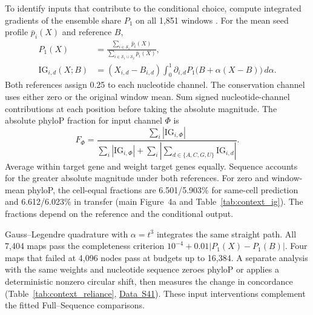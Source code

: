 \documentclass[11pt,a4paper]{article}
\newcommand{\tref}[1]{Table~\ref{#1}}
\newcommand{\data}[1]{\hyperref[data:S#1]{Data~S#1}}
\begin{document}
To identify inputs that contribute to the conditional choice, compute integrated gradients of the ensemble share $P_1$ on all 1,851 windows \citep{sundararajan2017integrated}. For the mean seed profile $\bar p_i(X)$ and reference $B$,
\begin{equation}\label{eq:share-ig}
\begin{aligned}
P_1(X)&=\frac{\sum_{i\in\mathcal S_1}\bar p_i(X)}
{\sum_{i\in\mathcal S_1\cup\mathcal S_2}\bar p_i(X)},\\
\mathrm{IG}_{i,d}(X;B)&=(X_{i,d}-B_{i,d})\int_0^1
\partial_{i,d}P_1\bigl(B+\alpha(X-B)\bigr)\,d\alpha .
\end{aligned}
\end{equation}
Both references assign 0.25 to each nucleotide channel. The conservation channel uses either zero or the original window mean. Sum signed nucleotide-channel contributions at each position before taking the absolute magnitude. The absolute phyloP fraction for input channel $\Phi$ is
\begin{equation}\label{eq:ig-fraction}
F_\Phi=
\frac{\sum_i|\mathrm{IG}_{i,\Phi}|}
{\sum_i|\mathrm{IG}_{i,\Phi}|+\sum_i|\sum_{d\in\{A,C,G,U\}}\mathrm{IG}_{i,d}|}.
\end{equation}
Average within target gene and weight target genes equally. Sequence accounts for the greater absolute magnitude under both references. For zero and window-mean phyloP, the cell-equal fractions are 6.501/5.903\% for same-cell prediction and 6.612/6.023\% in transfer (main Figure~4a and \tref{tab:context_ig}). The fractions depend on the reference and the conditional output.

Gauss--Legendre quadrature with $\alpha=t^3$ integrates the same straight path. All 7,404 maps pass the completeness criterion $10^{-4}+0.01|P_1(X)-P_1(B)|$. Four maps that failed at 4,096 nodes pass at budgets up to 16,384. A separate analysis with the same weights and nucleotide sequence zeroes phyloP or applies a deterministic nonzero circular shift, then measures the change in concordance (\tref{tab:context_reliance}, \data{41}). These input interventions complement the fitted Full--Sequence comparisons.
\end{document}
